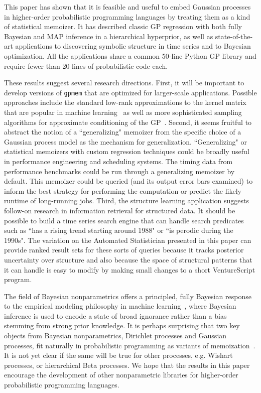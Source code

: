 This paper has shown that it is feasible and useful to embed Gaussian processes
in higher-order probabilistic programming languages by treating them as a kind
of statistical memoizer. It has described classic GP regression with both fully
Bayesian and MAP inference in a hierarchical hyperprior, as well as state-of-the-art
applications to discovering symbolic structure in time series and to Bayesian optimization.
All the applications share a common 50-line Python GP library and require fewer than 20 lines
of probabilistic code each.

These results suggest several research directions. First, it will be important
to develop versions of {\tt gpmem} that are optimized for larger-scale
applications. Possible approaches include the standard low-rank approximations
to the kernel matrix that are popular in machine learning~\citep{bui2014tree} as well
as more sophisticated sampling algorithms for approximate conditioning of the
GP~\citep{lawrence2009efficient}.
Second, it seems fruitful to abstract the notion of a ``generalizing" memoizer
from the specific choice of a Gaussian process model as the mechanism for
generalization. ``Generalizing" or statistical memoizers with custom regression techniques could be broadly useful in performance engineering and scheduling systems.
The timing data from performance benchmarks could be run through a generalizing memoizer by default.
This memoizer could be queried (and its output error bars examined) to inform the best strategy
for performing the computation or predict the likely runtime of long-running jobs.
 Third, the structure learning application suggests follow-on research in information
retrieval for structured data. It should be possible to build a time series search engine
that can handle search predicates such as ``has a rising trend starting around
1988" or ``is perodic during the 1990s".
The variation on the Automated Statistician presented in this paper can provide ranked result
sets for these sorts of queries because it tracks posterior uncertainty over structure and also
because the space of structural patterns that it can handle is easy to modify by making small
changes to a short VentureScript program.


The field of Bayesian nonparametrics offers a principled, fully Bayesian
response to the empirical modeling philosophy in machine learning~\citep{ghahramani2013bayesian},
where Bayesian inference is used to encode a state of broad ignorance rather
than a bias stemming from strong prior knowledge. It is perhaps surprising that
two key objects from Bayesian nonparametrics, Dirichlet processes and Gaussian
processes, fit naturally in probabilistic programming as variants of
memoization~\citep{roy2008stochastic}. It is not yet clear if the same will be true
for other processes, e.g. Wishart processes, or hierarchical Beta processes. We hope that the results in this paper encourage the development of other nonparametric libraries for higher-order probabilistic programming languages.
